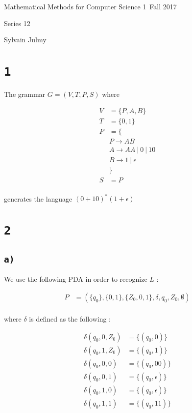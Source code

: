 \documentclass[a4paper,11pt]{report}
\author{Sylvain Julmy}
\date{\today}
\begin{document}
\begin{center}
  \Large{
    Mathematical Methods for Computer Science 1\
    Fall 2017
  }
  \noindent\makebox[\linewidth]{\rule{\linewidth}{0.4pt}}

  Series 12
  \vspace*{1.4cm}

  Sylvain Julmy
  
  \noindent\makebox[\linewidth]{\rule{\linewidth}{0.4pt}}
\end{center}

\section*{\texttt{1}}

The grammar $G = (V,T,P,S)$ where

\begin{align*}
  V &= \{P,A,B\}\\
  T &= \{0,1\} \\
  P &= \{ \\
    & P \to AB \\
    & A \to AA\ |\ 0\ |\ 10 \\
    & B \to 1\ |\ \epsilon \\
    &\}\\
  S &= P \\
\end{align*}

generates the language $(0 + 10)^*(1 + \epsilon)$

\section*{\texttt{2}}

\subsection*{\texttt{a)}}

We use the following PDA in order to recognize $L$ :

\begin{align*}
  P &= (\{q_0\},\{0,1\},\{Z_0,0,1\},\delta,q_0,Z_0,\emptyset) \\
\end{align*}

where $\delta$ is defined as the following :

\begin{align*}
  \delta(q_0,0,Z_0) &= \{(q_0,0)\} \\
  \delta(q_0,1,Z_0) &= \{(q_0,1)\} \\
  \delta(q_0,0, 0) &= \{(q_0,00)\} \\
  \delta(q_0,0, 1) &= \{(q_0,\epsilon)\} \\
  \delta(q_0,1, 0) &= \{(q_0,\epsilon)\} \\
  \delta(q_0,1, 1) &= \{(q_0,11)\} \\
\end{align*}
\end{document}

